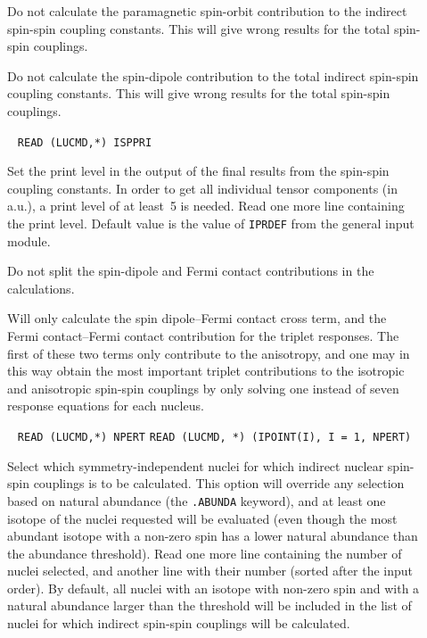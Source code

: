 \begin{description}
\item[] Do not calculate the paramagnetic
spin-orbit contribution to the indirect
spin-spin coupling constants. This will
give wrong results for the total spin-spin couplings.

\item[] Do not calculate the spin-dipole
contribution to
the total indirect spin-spin coupling
constants. This will give wrong
results for the total spin-spin couplings.

\item[]\verb| |\newline
\verb|READ (LUCMD,*) ISPPRI|

Set the print level in the output of the final results from the
spin-spin coupling constants. In order to get all individual tensor
components (in a.u.), a print level of at least~5 is needed. Read one
more line containing the print level. Default value is the value
of \verb|IPRDEF| from the general input module.

\item[] Do not split the
spin-dipole and Fermi
contact contributions in the calculations.

\item[]

Will only calculate the spin
dipole--Fermi contact cross
term, and the
Fermi contact--Fermi contact contribution for the triplet
responses. The first of these two terms only contribute to the
anisotropy, and one may in this way obtain the most important triplet
contributions to the isotropic and
anisotropic
spin-spin couplings by only solving one instead of seven response
equations for each nucleus.

\item[]\verb| |\newline
\verb|READ (LUCMD,*) NPERT|\newline
\verb|READ (LUCMD, *) (IPOINT(I), I = 1, NPERT)|

Select which symmetry-independent nuclei for which
indirect nuclear spin-spin couplings is to be calculated. This option
will override any
selection based on natural abundance (the \verb|.ABUNDA| keyword), and
at least one isotope of the nuclei requested will be evaluated (even
though the most abundant isotope with a non-zero spin has a lower
natural abundance
than the abundance threshold). Read one more line containing the
number of nuclei selected, and another line with their number (sorted after
the input order). By default, all nuclei with an isotope with non-zero spin
and with a natural abundance larger than the threshold will be included in
the list of nuclei for which indirect spin-spin couplings will be
calculated.


\end{description}
